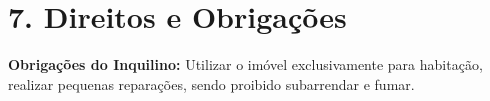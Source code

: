\section*{7. Direitos e Obrigações}
\textbf{Obrigações do Inquilino:} Utilizar o imóvel exclusivamente para habitação, realizar pequenas reparações, sendo proibido subarrendar e fumar.
